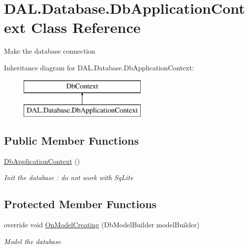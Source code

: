 \hypertarget{class_d_a_l_1_1_database_1_1_db_application_context}{}\section{D\+A\+L.\+Database.\+Db\+Application\+Context Class Reference}
\label{class_d_a_l_1_1_database_1_1_db_application_context}


Make the database connection  


Inheritance diagram for D\+A\+L.\+Database.\+Db\+Application\+Context\+:\begin{figure}[H]
\begin{center}
\leavevmode
\includegraphics[height=2.000000cm]{class_d_a_l_1_1_database_1_1_db_application_context}
\end{center}
\end{figure}
\subsection*{Public Member Functions}
\begin{DoxyCompactItemize}
\item 
\hyperlink{class_d_a_l_1_1_database_1_1_db_application_context_ab5a2eb81194b1c06a325186fb3e5dbb1}{Db\+Application\+Context} ()
\begin{DoxyCompactList}\small\item\em Init the database \+: do not work with Sq\+Lite \end{DoxyCompactList}\end{DoxyCompactItemize}
\subsection*{Protected Member Functions}
\begin{DoxyCompactItemize}
\item 
override void \hyperlink{class_d_a_l_1_1_database_1_1_db_application_context_a19a77500b7e8ab9e3570a5abd81dc542}{On\+Model\+Creating} (Db\+Model\+Builder model\+Builder)
\begin{DoxyCompactList}\small\item\em Model the database \end{DoxyCompactList}\end{DoxyCompactItemize}
